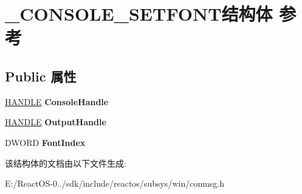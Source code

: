 \hypertarget{struct___c_o_n_s_o_l_e___s_e_t_f_o_n_t}{}\section{\+\_\+\+C\+O\+N\+S\+O\+L\+E\+\_\+\+S\+E\+T\+F\+O\+N\+T结构体 参考}
\label{struct___c_o_n_s_o_l_e___s_e_t_f_o_n_t}
\subsection*{Public 属性}
\begin{DoxyCompactItemize}
\item 
\mbox{\label{struct___c_o_n_s_o_l_e___s_e_t_f_o_n_t_a65a4587f6d8c7593d69fc1f64c7cbc6f}} 
\hyperlink{interfacevoid}{H\+A\+N\+D\+LE} {\bfseries Console\+Handle}
\item 
\mbox{\label{struct___c_o_n_s_o_l_e___s_e_t_f_o_n_t_ae3a7ff33e29f6091e9ea02f421be6ed3}} 
\hyperlink{interfacevoid}{H\+A\+N\+D\+LE} {\bfseries Output\+Handle}
\item 
\mbox{\label{struct___c_o_n_s_o_l_e___s_e_t_f_o_n_t_a753f38cdd9cd95d0d4f82af5d8084dd9}} 
D\+W\+O\+RD {\bfseries Font\+Index}
\end{DoxyCompactItemize}


该结构体的文档由以下文件生成\+:\begin{DoxyCompactItemize}
\item 
E\+:/\+React\+O\+S-\/0../sdk/include/reactos/subsys/win/conmsg.\+h\end{DoxyCompactItemize}
